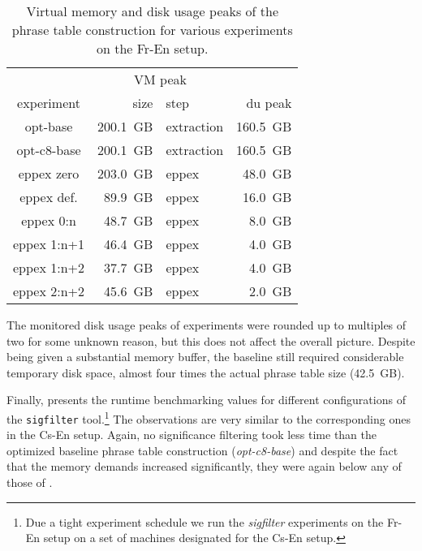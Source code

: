 \begin{table}[ht]
\centering
\begin{tabular}{ | c | r l | r | }
\hline
 & \multicolumn{2}{|c|}{VM peak} & \\
experiment & size & step & du peak \\
\hline
\hline
opt-base       & 200.1~GB & extraction & 160.5~GB \\
opt-c8-base    & 200.1~GB & extraction & 160.5~GB \\
eppex zero     & 203.0~GB &      eppex &  48.0~GB \\
\hline
eppex def.     &  89.9~GB &      eppex &  16.0~GB \\
eppex 0:n      &  48.7~GB &      eppex &   8.0~GB \\
eppex 1:n+1    &  46.4~GB &      eppex &   4.0~GB \\
eppex 1:n+2    &  37.7~GB &      eppex &   4.0~GB \\
eppex 2:n+2    &  45.6~GB &      eppex &   2.0~GB \\
\hline
\end{tabular}
\caption{\label{fr-en-vm-and-disk-usage-peaks}
Virtual memory and disk usage peaks of the phrase table construction for various experiments on the Fr-En setup.}
\end{table}

The monitored disk usage peaks of \eppex{} experiments were rounded up
to multiples of two for some unknown reason, but this does not affect
the overall picture.
Despite being given a substantial memory buffer, the baseline still
required considerable temporary disk space, almost four times the
actual phrase table size (42.5~GB).

Finally,  presents the runtime benchmarking
values for different configurations of the \texttt{sigfilter} tool.\footnote{Due a tight
experiment schedule we run the \emph{sigfilter} experiments on the Fr-En setup on a set of
machines designated for the Cs-En setup.}
The observations are very similar to the corresponding ones in the Cs-En setup.
Again, no significance filtering took less time than the optimized baseline phrase table
construction (\emph{opt-c8-base}) and despite the fact that the memory demands increased
significantly, they were again below any of those of \eppex{}.


